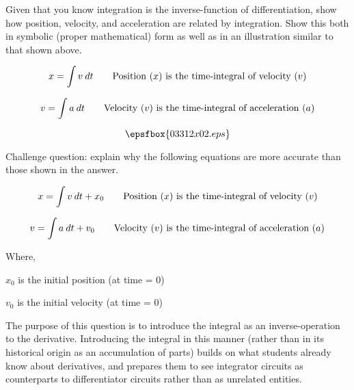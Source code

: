 Given that you know integration is the inverse-function of differentiation, show how position, velocity, and acceleration are related by integration.  Show this both in symbolic (proper mathematical) form as well as in an illustration similar to that shown above.







$$x = \int v \> dt \hbox{\hskip 20pt Position (}x \hbox{) is the time-integral of velocity (}v \hbox{)}$$

$$v = \int a \> dt \hbox{\hskip 20pt Velocity (}v \hbox{) is the time-integral of acceleration (}a \hbox{)}$$

$$\epsfbox{03312x02.eps}$$

\vskip 10pt

Challenge question: explain why the following equations are more accurate than those shown in the answer.

$$x = \int v \> dt + x_0 \hbox{\hskip 20pt Position (}x \hbox{) is the time-integral of velocity (}v \hbox{)}$$

$$v = \int a \> dt + v_0 \hbox{\hskip 20pt Velocity (}v \hbox{) is the time-integral of acceleration (}a \hbox{)}$$

\noindent
Where,

$x_0$ is the initial position (at time = 0)

$v_0$ is the initial velocity (at time = 0)







The purpose of this question is to introduce the integral as an inverse-operation to the derivative.  Introducing the integral in this manner (rather than in its historical origin as an accumulation of parts) builds on what students already know about derivatives, and prepares them to see integrator circuits as counterparts to differentiator circuits rather than as unrelated entities.




